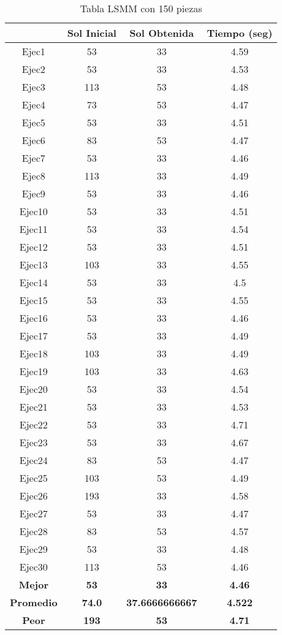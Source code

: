 
\begin{table}
\caption{Tabla LSMM con 150 piezas}
\centering
\begin{tabular}{|c|c|c|c|}
\hline
 & {\bf Sol Inicial} & {\bf Sol Obtenida} & {\bf Tiempo (seg)} \\
\hline
Ejec1 & 53 & 33  & 4.59 \\
\hline
Ejec2 & 53 & 33  & 4.53 \\
\hline
Ejec3 & 113 & 53  & 4.48 \\
\hline
Ejec4 & 73 & 53  & 4.47 \\
\hline
Ejec5 & 53 & 33  & 4.51 \\
\hline
Ejec6 & 83 & 53  & 4.47 \\
\hline
Ejec7 & 53 & 33  & 4.46 \\
\hline
Ejec8 & 113 & 33  & 4.49 \\
\hline
Ejec9 & 53 & 33  & 4.46 \\
\hline
Ejec10 & 53 & 33  & 4.51 \\
\hline
Ejec11 & 53 & 33  & 4.54 \\
\hline
Ejec12 & 53 & 33  & 4.51 \\
\hline
Ejec13 & 103 & 33  & 4.55 \\
\hline
Ejec14 & 53 & 33  & 4.5 \\
\hline
Ejec15 & 53 & 33  & 4.55 \\
\hline
Ejec16 & 53 & 33  & 4.46 \\
\hline
Ejec17 & 53 & 33  & 4.49 \\
\hline
Ejec18 & 103 & 33  & 4.49 \\
\hline
Ejec19 & 103 & 33  & 4.63 \\
\hline
Ejec20 & 53 & 33  & 4.54 \\
\hline
Ejec21 & 53 & 33  & 4.53 \\
\hline
Ejec22 & 53 & 33  & 4.71 \\
\hline
Ejec23 & 53 & 33  & 4.67 \\
\hline
Ejec24 & 83 & 53  & 4.47 \\
\hline
Ejec25 & 103 & 53  & 4.49 \\
\hline
Ejec26 & 193 & 33  & 4.58 \\
\hline
Ejec27 & 53 & 33  & 4.47 \\
\hline
Ejec28 & 83 & 53  & 4.57 \\
\hline
Ejec29 & 53 & 33  & 4.48 \\
\hline
Ejec30 & 113 & 53  & 4.46 \\
\hline
{\bf Mejor} & {\bf 53} & {\bf 33} & {\bf 4.46} \\
\hline
{\bf Promedio} & {\bf 74.0} & {\bf 37.6666666667} & {\bf 4.522} \\
\hline
{\bf Peor} & {\bf 193} & {\bf 53} & {\bf 4.71} \\
\hline
\end{tabular}
\end{table}

